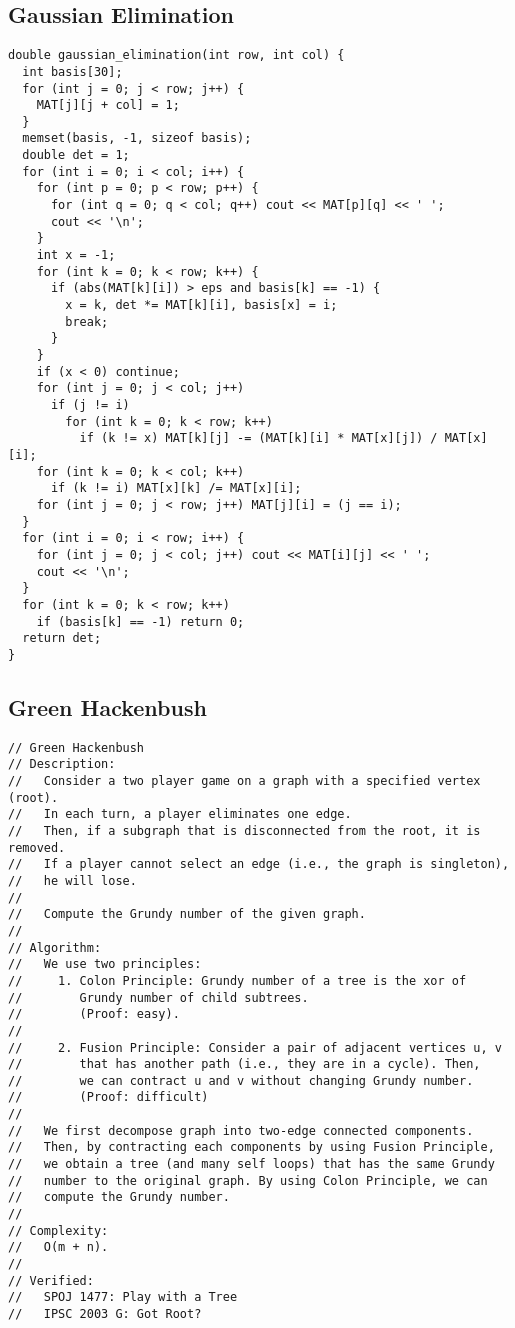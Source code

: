 \documentclass[FSZ,a4paper,onesided]{article}
\begin{document}
\begin{multicols*}{\COLS}
\subsection{Gaussian Elimination}
\begin{lstlisting}
double gaussian_elimination(int row, int col) {
  int basis[30];
  for (int j = 0; j < row; j++) {
    MAT[j][j + col] = 1;
  }
  memset(basis, -1, sizeof basis);
  double det = 1;
  for (int i = 0; i < col; i++) {
    for (int p = 0; p < row; p++) {
      for (int q = 0; q < col; q++) cout << MAT[p][q] << ' ';
      cout << '\n';
    }
    int x = -1;
    for (int k = 0; k < row; k++) {
      if (abs(MAT[k][i]) > eps and basis[k] == -1) {
        x = k, det *= MAT[k][i], basis[x] = i;
        break;
      }
    }
    if (x < 0) continue;
    for (int j = 0; j < col; j++)
      if (j != i)
        for (int k = 0; k < row; k++)
          if (k != x) MAT[k][j] -= (MAT[k][i] * MAT[x][j]) / MAT[x][i];
    for (int k = 0; k < col; k++)
      if (k != i) MAT[x][k] /= MAT[x][i];
    for (int j = 0; j < row; j++) MAT[j][i] = (j == i);
  }
  for (int i = 0; i < row; i++) {
    for (int j = 0; j < col; j++) cout << MAT[i][j] << ' ';
    cout << '\n';
  }
  for (int k = 0; k < row; k++)
    if (basis[k] == -1) return 0;
  return det;
}
\end{lstlisting}
\subsection{Green Hackenbush}
\begin{lstlisting}
// Green Hackenbush
// Description:
//   Consider a two player game on a graph with a specified vertex (root).
//   In each turn, a player eliminates one edge.
//   Then, if a subgraph that is disconnected from the root, it is removed.
//   If a player cannot select an edge (i.e., the graph is singleton),
//   he will lose.
//
//   Compute the Grundy number of the given graph.
//
// Algorithm:
//   We use two principles:
//     1. Colon Principle: Grundy number of a tree is the xor of
//        Grundy number of child subtrees.
//        (Proof: easy).
//
//     2. Fusion Principle: Consider a pair of adjacent vertices u, v
//        that has another path (i.e., they are in a cycle). Then,
//        we can contract u and v without changing Grundy number.
//        (Proof: difficult)
//
//   We first decompose graph into two-edge connected components.
//   Then, by contracting each components by using Fusion Principle,
//   we obtain a tree (and many self loops) that has the same Grundy
//   number to the original graph. By using Colon Principle, we can
//   compute the Grundy number.
//
// Complexity:
//   O(m + n).
//
// Verified:
//   SPOJ 1477: Play with a Tree
//   IPSC 2003 G: Got Root?


\end{lstlisting}
\end{multicols*}
\end{document}
